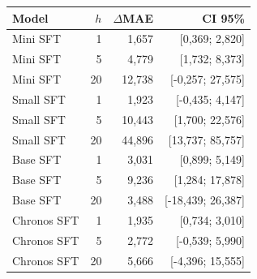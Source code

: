 \begin{tabular}{@{}lrrr@{}}
\toprule
Model & $h$ & $\Delta$MAE & CI 95\% \\
\midrule
Mini SFT & 1 & 1,657 & [0,369; 2,820] \\
Mini SFT & 5 & 4,779 & [1,732; 8,373] \\
Mini SFT & 20 & 12,738 & [-0,257; 27,575] \\
Small SFT & 1 & 1,923 & [-0,435; 4,147] \\
Small SFT & 5 & 10,443 & [1,700; 22,576] \\
Small SFT & 20 & 44,896 & [13,737; 85,757] \\
Base SFT & 1 & 3,031 & [0,899; 5,149] \\
Base SFT & 5 & 9,236 & [1,284; 17,878] \\
Base SFT & 20 & 3,488 & [-18,439; 26,387] \\
Chronos SFT & 1 & 1,935 & [0,734; 3,010] \\
Chronos SFT & 5 & 2,772 & [-0,539; 5,990] \\
Chronos SFT & 20 & 5,666 & [-4,396; 15,555] \\
\bottomrule
\end{tabular}
